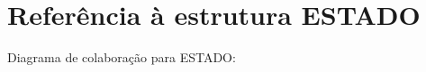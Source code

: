 \hypertarget{structESTADO}{}\section{Referência à estrutura E\+S\+T\+A\+DO}
\label{structESTADO}


Diagrama de colaboração para E\+S\+T\+A\+DO\+:
